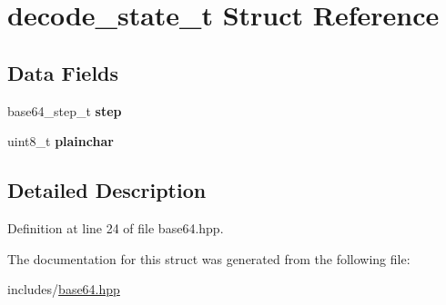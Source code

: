 \hypertarget{structdecode__state__t}{}\section{decode\+\_\+state\+\_\+t Struct Reference}
\label{structdecode__state__t}
\subsection*{Data Fields}
\begin{DoxyCompactItemize}
\item 
\hypertarget{structdecode__state__t_a3c765f26a8d14eb121307bea7a50c2bd}{}base64\+\_\+step\+\_\+t {\bfseries step}\label{structdecode__state__t_a3c765f26a8d14eb121307bea7a50c2bd}

\item 
\hypertarget{structdecode__state__t_a96da3c67e61b4cee0d95d66100775e1b}{}uint8\+\_\+t {\bfseries plainchar}\label{structdecode__state__t_a96da3c67e61b4cee0d95d66100775e1b}

\end{DoxyCompactItemize}


\subsection{Detailed Description}


Definition at line 24 of file base64.\+hpp.



The documentation for this struct was generated from the following file\+:\begin{DoxyCompactItemize}
\item 
includes/\hyperlink{base64_8hpp}{base64.\+hpp}\end{DoxyCompactItemize}
